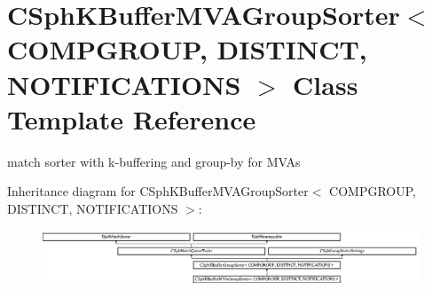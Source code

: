 \hypertarget{classCSphKBufferMVAGroupSorter}{\section{C\-Sph\-K\-Buffer\-M\-V\-A\-Group\-Sorter$<$ C\-O\-M\-P\-G\-R\-O\-U\-P, D\-I\-S\-T\-I\-N\-C\-T, N\-O\-T\-I\-F\-I\-C\-A\-T\-I\-O\-N\-S $>$ Class Template Reference}
\label{classCSphKBufferMVAGroupSorter}
}


match sorter with k-\/buffering and group-\/by for M\-V\-As  


Inheritance diagram for C\-Sph\-K\-Buffer\-M\-V\-A\-Group\-Sorter$<$ C\-O\-M\-P\-G\-R\-O\-U\-P, D\-I\-S\-T\-I\-N\-C\-T, N\-O\-T\-I\-F\-I\-C\-A\-T\-I\-O\-N\-S $>$\-:\begin{figure}[H]
\begin{center}
\leavevmode
\includegraphics[height=1.602289cm]{classCSphKBufferMVAGroupSorter}
\end{center}
\end{figure}

